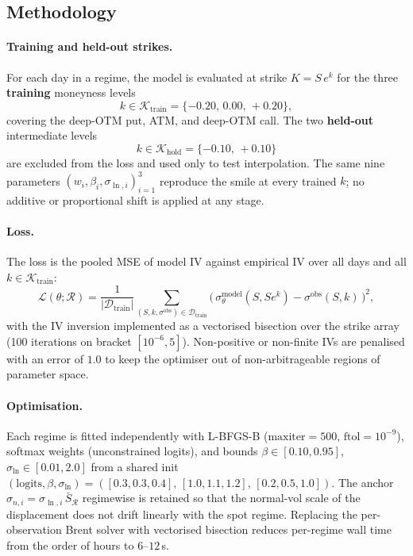 \documentclass[12pt]{article}
\begin{document}
\subsection{Methodology}

\paragraph{Training and held-out strikes.} For each day in a regime, the model is evaluated at strike $K = S\,e^{k}$ for the three \textbf{training} moneyness levels
\begin{equation}
  k \in \mathcal{K}_{\text{train}} = \{-0.20,\,0.00,\,+0.20\},
\end{equation}
covering the deep-OTM put, ATM, and deep-OTM call. The two \textbf{held-out} intermediate levels
\begin{equation}
  k \in \mathcal{K}_{\text{hold}} = \{-0.10,\,+0.10\}
\end{equation}
are excluded from the loss and used only to test interpolation. The same nine parameters $(w_i, \beta_i, \sigma_{\ln,i})_{i=1}^{3}$ reproduce the smile at every trained $k$; no additive or proportional shift is applied at any stage.

\paragraph{Loss.} The loss is the pooled MSE of model IV against empirical IV over all days and all $k \in \mathcal{K}_{\text{train}}$:
\begin{equation}
  \mathcal{L}(\theta;\mathcal{R}) = \frac{1}{|\mathcal{D}_{\text{train}}|}
  \sum_{(S,k,\sigma^{\text{obs}})\in\mathcal{D}_{\text{train}}}
  \bigl(\,\sigma^{\text{model}}_{\theta}(S, S e^{k}) - \sigma^{\text{obs}}(S,k)\,\bigr)^{2},
  \label{eq:jointloss}
\end{equation}
with the IV inversion implemented as a vectorised bisection over the strike array (100 iterations on bracket $[10^{-6}, 5]$). Non-positive or non-finite IVs are penalised with an error of $1.0$ to keep the optimiser out of non-arbitrageable regions of parameter space.

\paragraph{Optimisation.} Each regime is fitted independently with L-BFGS-B ($\text{maxiter}=500$, $\text{ftol}=10^{-9}$), softmax weights (unconstrained logits), and bounds $\beta \in [0.10, 0.95]$, $\sigma_{\ln} \in [0.01, 2.0]$ from a shared init $(\text{logits},\beta,\sigma_{\ln}) = ([0.3,0.3,0.4],\, [1.0,1.1,1.2],\, [0.2,0.5,1.0])$. The anchor $\sigma_{n,i} = \sigma_{\ln,i}\,\bar S_{\mathcal R}$ regimewise is retained so that the normal-vol scale of the displacement does not drift linearly with the spot regime. Replacing the per-observation Brent solver with vectorised bisection reduces per-regime wall time from the order of hours to $6$--$12\,$s.
\end{document}
